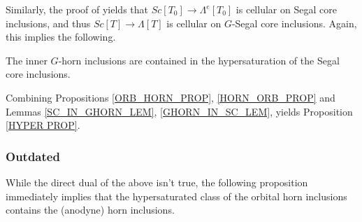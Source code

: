 \documentclass[a4paper,10pt,draft]{article}%
\numberwithin{equation}{section}%
\begin{document}
Similarly, the proof of \cite[2.5]{CM13a} yields that
$Sc[T_0] \to \Lambda^e[T_0]$ is cellular on Segal core inclusions, and thus
$Sc[T] \to \Lambda[T]$ is cellular on $G$-Segal core inclusions.
Again, this implies the following.
\begin{lemma}
      \label{GHORN_IN_SC_LEM}
      The inner $G$-horn inclusions are contained in the hypersaturation of the Segal core inclusions.
\end{lemma}

Combining Propositions \ref{ORB_HORN_PROP}, \ref{HORN_ORB_PROP} and Lemmas \ref{SC_IN_GHORN_LEM}, \ref{GHORN_IN_SC_LEM}, yields Proposition \ref{HYPER PROP}.





\subsubsection{Outdated}

While the direct dual of the above isn't true,
the following proposition immediately implies that
the hypersaturated class of the orbital horn inclusions contains
the (anodyne) horn inclusions.
\end{document}
